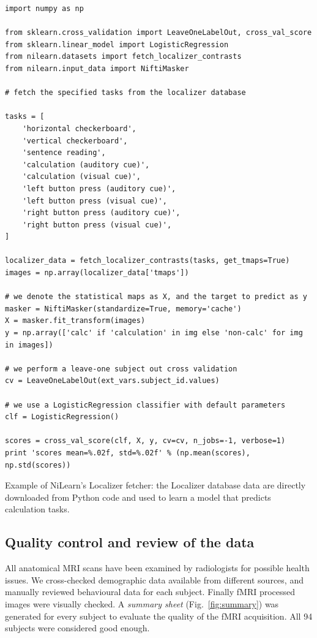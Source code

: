 \documentclass[preprint,review,12pt]{elsarticle}
\begin{document}
\begin{listing}[H]
\begin{verbatim}
import numpy as np

from sklearn.cross_validation import LeaveOneLabelOut, cross_val_score
from sklearn.linear_model import LogisticRegression
from nilearn.datasets import fetch_localizer_contrasts
from nilearn.input_data import NiftiMasker

# fetch the specified tasks from the localizer database

tasks = [
    'horizontal checkerboard',
    'vertical checkerboard',
    'sentence reading',
    'calculation (auditory cue)',
    'calculation (visual cue)',
    'left button press (auditory cue)',
    'left button press (visual cue)',
    'right button press (auditory cue)',
    'right button press (visual cue)',
]

localizer_data = fetch_localizer_contrasts(tasks, get_tmaps=True)
images = np.array(localizer_data['tmaps'])

# we denote the statistical maps as X, and the target to predict as y
masker = NiftiMasker(standardize=True, memory='cache')
X = masker.fit_transform(images)
y = np.array(['calc' if 'calculation' in img else 'non-calc' for img in images])

# we perform a leave-one subject out cross validation
cv = LeaveOneLabelOut(ext_vars.subject_id.values)

# we use a LogisticRegression classifier with default parameters
clf = LogisticRegression()

scores = cross_val_score(clf, X, y, cv=cv, n_jobs=-1, verbose=1)
print 'scores mean=%.02f, std=%.02f' % (np.mean(scores), np.std(scores))
\end{verbatim}
\caption{Example of NiLearn's Localizer fetcher: the Localizer database data are directly downloaded from Python code and used to learn a model that predicts calculation tasks.}
\label{code:NiLearn}
\end{listing}


\subsection{Quality control and review of the data}

All anatomical MRI scans have been examined by radiologists for possible health issues. We cross-checked demographic data available from different sources, and manually reviewed behavioural data for each subject. Finally fMRI processed images were visually checked. A \emph{summary sheet} (Fig.~\ref{fig:summary}) was generated for every subject to evaluate the quality of the fMRI acquisition. All 94 subjects were considered good enough.
\end{document}
